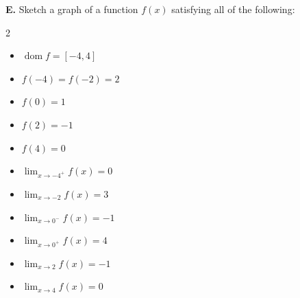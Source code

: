 \medskip
\noindent\textbf{E.} Sketch a graph of a function \(f(x)\) satisfying all of the following:
\begin{multicols}{2}
\begin{itemize}[nosep, topsep=0pt, itemsep=3pt]
    \item \(\operatorname{dom} f = [-4, 4]\)
    \item \(f(-4) = f(-2) = 2\)
    \item \(f(0) = 1\)
    \item \(f(2) = -1\)
    \item \(f(4) = 0\)
    
    \columnbreak
    
    \item \(\displaystyle\lim_{x \to -4^{+}} f(x) = 0\)
    \item \(\displaystyle\lim_{x \to -2} f(x) = 3\)
    \item \(\displaystyle\lim_{x \to 0^{-}} f(x) = -1\)
    \item \(\displaystyle\lim_{x \to 0^{+}} f(x) = 4\)
    \item \(\displaystyle\lim_{x \to 2} f(x) = -1\)
    \item \(\displaystyle\lim_{x \to 4} f(x) = 0\)
\end{itemize}
\end{multicols}

